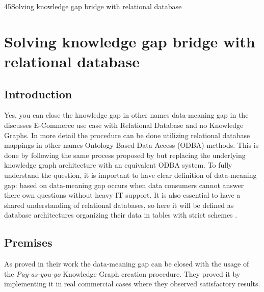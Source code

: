 \begin{question}{4}{5}{Solving knowledge gap bridge with relational database}

\section{Solving knowledge gap bridge with relational database}

\subsection{Introduction}

Yes, you can close the knowledge gap in other names data-meaning gap in the discusses E-Commerce use case with Relational Database and no Knowledge Graphs. In more detail the procedure can be done utilizing relational database mappings in other names Ontology-Based Data Access (ODBA) \cite{poggi_linking_2008} methods. This is done by following the same process proposed by \citet{sequeda_pay-as-you-go_2019} but replacing the underlying knowledge graph architecture with an equivalent ODBA system.
To fully understand the question, it is important to have clear definition of data-meaning gap: based on \citet{sequeda_pay-as-you-go_2019} data-meaning gap occurs when data consumers cannot answer there own questions without heavy IT support. It is also essential to have a shared understanding of relational databases, so here it will be defined as database architectures organizing their data in tables with strict schemes \cite{codd_relational_1970}.

\subsection{Premises}

As \citet{sequeda_pay-as-you-go_2019} proved in their work the data-meaning gap can be closed with the usage of the \textit{Pay-as-you-go} Knowledge Graph creation procedure. They proved it by implementing it in real commercial cases where they observed satisfactory results.


\end{question}
